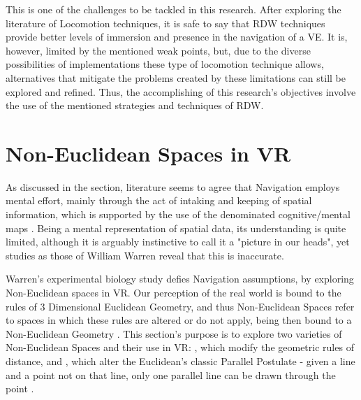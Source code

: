 This is one of the challenges to be tackled in this research. After exploring the literature of Locomotion techniques, 
it is safe to say that \gls{RDW} techniques provide better levels of immersion and presence in the navigation of a \gls{VE}. It is, however, 
limited by the mentioned weak points, but, due to the diverse possibilities of implementations these type of locomotion technique allows, 
alternatives that mitigate the problems created by these limitations can still be explored and refined. Thus, the accomplishing of this 
research's objectives involve the use of the mentioned strategies and techniques of \gls{RDW}.





\section{Non-Euclidean Spaces in VR}
\label{sec:non-euclidean-space}

As discussed in the  section, literature seems to agree that Navigation employs mental effort, mainly through the 
act of intaking and keeping of spatial information, which is supported by the use of the denominated cognitive/mental maps \cite{Eastgate2014}. 
Being a mental representation of spatial data, its understanding is quite limited, although it is arguably instinctive to call it a 
"picture in our heads", yet studies as those of William Warren \cite{Warren2019} reveal that this is inaccurate.

Warren's experimental biology study \cite{Warren2019} defies Navigation assumptions, by exploring Non-Euclidean spaces in \gls{VR}. 
Our perception of the real world is bound to the rules of 3 Dimensional Euclidean Geometry, and thus Non-Euclidean Spaces refer to spaces 
in which these rules are altered or do not apply, being then bound to a Non-Euclidean Geometry . This section's purpose is to explore 
two varieties of Non-Euclidean Spaces and their use in \gls{VR}: , which modify the geometric rules of distance, 
and , which alter the Euclidean's classic Parallel Postulate - given a line and a point not on that line, 
only one parallel line can be drawn through the point \cite{Pisani2019}.

